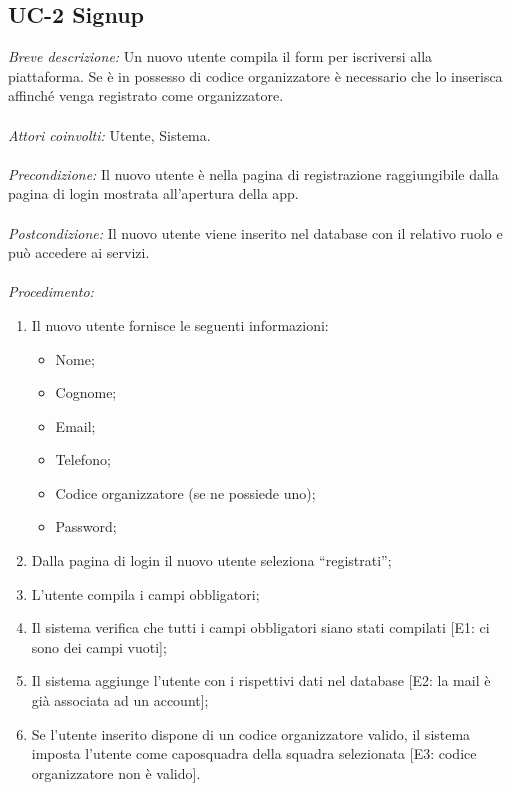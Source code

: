 \subsection{UC-2 Signup}
\textit{Breve descrizione:} Un nuovo utente compila il form per iscriversi alla piattaforma. Se è in possesso di codice organizzatore è necessario che lo inserisca affinché venga registrato come organizzatore.
\\
\\
\textit{Attori coinvolti:} Utente, Sistema.
\\
\\
\textit{Precondizione:} Il nuovo utente è nella pagina di registrazione raggiungibile dalla pagina di login mostrata all'apertura della app.
\\
\\
\textit{Postcondizione:} Il nuovo utente viene inserito nel database con il relativo ruolo e può accedere ai servizi.
\\
\\
\textit{Procedimento:}
\begin{enumerate}
	\item Il nuovo utente fornisce le seguenti informazioni:
	\begin{itemize}
		\item Nome;
		\item Cognome;
		\item Email;
		\item Telefono;
		\item Codice organizzatore (se ne possiede uno);
		\item Password;
	\end{itemize}
	\item Dalla pagina di login il nuovo utente seleziona ``registrati'';
	\item L'utente compila i campi obbligatori;
	\item Il sistema verifica che tutti i campi obbligatori siano stati compilati [E1: ci sono dei campi vuoti];
	\item Il sistema aggiunge l'utente con i rispettivi dati nel database [E2: la mail è già associata ad un account];
	\item Se l'utente inserito dispone di un codice organizzatore valido, il sistema imposta l'utente come caposquadra della squadra selezionata [E3: codice organizzatore non è valido].
\end{enumerate}


